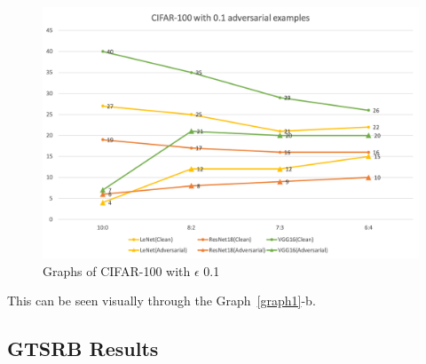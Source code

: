\documentclass[journal,article,submit,moreauthors,pdftex]{Definitions/mdpi}
\begin{document}
\begin{figure}[H]
    \includegraphics[width=13 cm]{Definitions/graph-01cifar100.png}
    \caption{Graphs of CIFAR-100 with \begin{math}\epsilon\end{math} 0.1\label{graph4}}
\end{figure} 

This can be seen visually through the Graph~\ref{graph1}-b.

\subsection{GTSRB Results}
\end{document}
